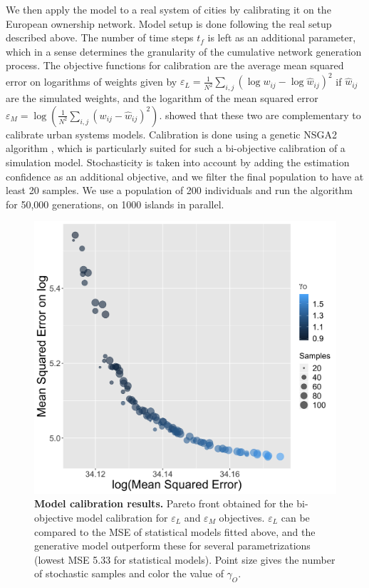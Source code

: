 \documentclass[10pt,letterpaper]{article}
\begin{document}
We then apply the model to a real system of cities by calibrating it on the European ownership network. Model setup is done following the real setup described above. The number of time steps $t_f$ is left as an additional parameter, which in a sense determines the granularity of the cumulative network generation process. The objective functions for calibration are the average mean squared error on logarithms of weights given by $\varepsilon_L = \frac{1}{N^2} \sum_{i,j} \left(\log w_{ij} - \log \hat{w}_{ij} \right)^2$ if $\hat{w}_{ij}$ are the simulated weights, and the logarithm of the mean squared error $\varepsilon_M = \log\left(\frac{1}{N^2} \sum_{i,j} \left(w_{ij} - \hat{w}_{ij}\right)^2 \right)$. \cite{raimbault2018indirect} showed that these two are complementary to calibrate urban systems models. Calibration is done using a genetic NSGA2 algorithm \cite{deb2002fast}, which is particularly suited for such a bi-objective calibration of a simulation model. Stochasticity is taken into account by adding the estimation confidence as an additional objective, and we filter the final population to have at least 20 samples. We use a population of 200 individuals and run the algorithm for 50,000 generations, on 1000 islands in parallel.


\begin{figure}
	\begin{center}
    \includegraphics[width=0.75\linewidth]{figures/Fig8.png}
    \end{center}
	\caption{\textbf{Model calibration results.} Pareto front obtained for the bi-objective model calibration for $\varepsilon_L$ and $\varepsilon_M$ objectives. $\varepsilon_L$ can be compared to the MSE of statistical models fitted above, and the generative model outperform these for several parametrizations (lowest MSE 5.33 for statistical models). Point size gives the number of stochastic samples and color the value of $\gamma_O$.\label{fig:fig8}}
\end{figure}
\end{document}
